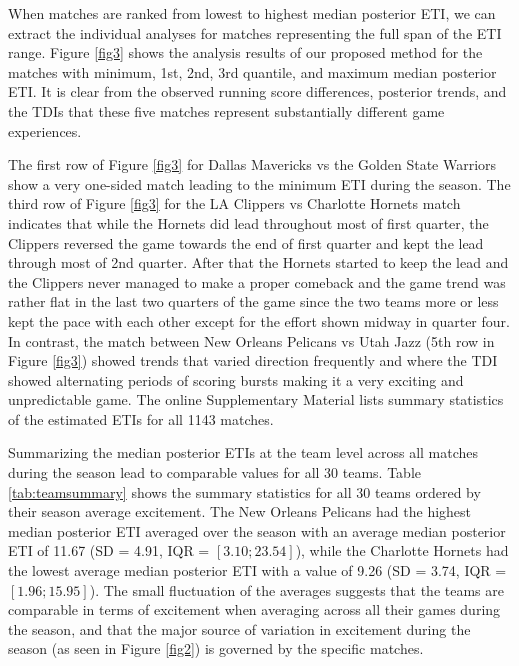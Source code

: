 \documentclass[
  11pt,
]{svjour3}
\theoremstyle{nonumberplain}
\begin{document}
When matches are ranked from lowest to highest median posterior ETI, we
can extract the individual analyses for matches representing the full
span of the ETI range. Figure \ref{fig3} shows the analysis results of
our proposed method for the matches with minimum, 1st, 2nd, 3rd
quantile, and maximum median posterior ETI. It is clear from the
observed running score differences, posterior trends, and the TDIs that
these five matches represent substantially different game experiences.

The first row of Figure \ref{fig3} for Dallas Mavericks vs the Golden
State Warriors show a very one-sided match leading to the minimum ETI
during the season. The third row of Figure \ref{fig3} for the LA
Clippers vs Charlotte Hornets match indicates that while the Hornets did
lead throughout most of first quarter, the Clippers reversed the game
towards the end of first quarter and kept the lead through most of 2nd
quarter. After that the Hornets started to keep the lead and the
Clippers never managed to make a proper comeback and the game trend was
rather flat in the last two quarters of the game since the two teams
more or less kept the pace with each other except for the effort shown
midway in quarter four. In contrast, the match between New Orleans
Pelicans vs Utah Jazz (5th row in Figure \ref{fig3}) showed trends that
varied direction frequently and where the TDI showed alternating periods
of scoring bursts making it a very exciting and unpredictable game. The
online Supplementary Material lists summary statistics of the estimated
ETIs for all 1143 matches.

Summarizing the median posterior ETIs at the team level across all
matches during the season lead to comparable values for all 30 teams.
Table \ref{tab:teamsummary} shows the summary statistics for all 30
teams ordered by their season average excitement. The New Orleans
Pelicans had the highest median posterior ETI averaged over the season
with an average median posterior ETI of 11.67 (SD = 4.91, IQR =
\([3.10; 23.54]\)), while the Charlotte Hornets had the lowest average
median posterior ETI with a value of 9.26 (SD = 3.74, IQR =
\([1.96; 15.95]\)). The small fluctuation of the averages suggests that
the teams are comparable in terms of excitement when averaging across
all their games during the season, and that the major source of
variation in excitement during the season (as seen in Figure \ref{fig2})
is governed by the specific matches.
\end{document}
